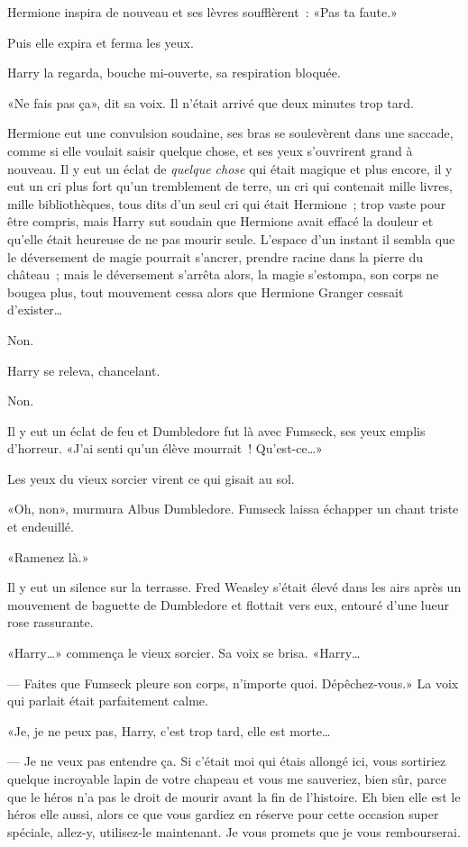 Hermione inspira de nouveau et ses lèvres soufflèrent~: «Pas ta faute.»

Puis elle expira et ferma les yeux.

Harry la regarda, bouche mi-ouverte, sa respiration bloquée.

«Ne fais pas ça», dit sa voix. Il n'était arrivé que deux minutes trop tard.

Hermione eut une convulsion soudaine, ses bras se soulevèrent dans une saccade, comme si elle voulait saisir quelque chose, et ses yeux s'ouvrirent grand à nouveau. Il y eut un éclat de \emph{quelque chose} qui était magique et plus encore, il y eut un cri plus fort qu'un tremblement de terre, un cri qui contenait mille livres, mille bibliothèques, tous dits d'un seul cri qui était Hermione~; trop vaste pour être compris, mais Harry sut soudain que Hermione avait effacé la douleur et qu'elle était heureuse de ne pas mourir seule. L'espace d'un instant il sembla que le déversement de magie pourrait s'ancrer, prendre racine dans la pierre du château~; mais le déversement s'arrêta alors, la magie s'estompa, son corps ne bougea plus, tout mouvement cessa alors que Hermione Granger cessait d'exister…

Non.

Harry se releva, chancelant.

Non.

Il y eut un éclat de feu et Dumbledore fut là avec Fumseck, ses yeux emplis d'horreur. «J'ai senti qu'un élève mourrait~! Qu'est-ce…»

Les yeux du vieux sorcier virent ce qui gisait au sol.

«Oh, non», murmura Albus Dumbledore. Fumseck laissa échapper un chant triste et endeuillé.

«Ramenez là.»

Il y eut un silence sur la terrasse. Fred Weasley s'était élevé dans les airs après un mouvement de baguette de Dumbledore et flottait vers eux, entouré d'une lueur rose rassurante.

«Harry…» commença le vieux sorcier. Sa voix se brisa. «Harry…

--- Faites que Fumseck pleure son corps, n'importe quoi. Dépêchez-vous.» La voix qui parlait était parfaitement calme.

«Je, je ne peux pas, Harry, c'est trop tard, elle est morte…

--- Je ne veux pas entendre ça. Si c'était moi qui étais allongé ici, vous sortiriez quelque incroyable lapin de votre chapeau et vous me sauveriez, bien sûr, parce que le héros n'a pas le droit de mourir avant la fin de l'histoire. Eh bien elle est le héros elle aussi, alors ce que vous gardiez en réserve pour cette occasion super spéciale, allez-y, utilisez-le maintenant. Je vous promets que je vous rembourserai.

